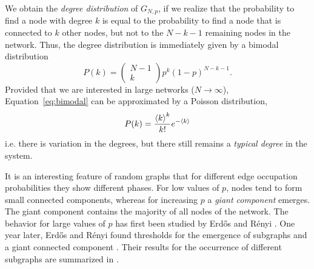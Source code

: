 We obtain the \emph{degree distribution} of $G_{N,p}$, if we realize that the probability to find a node with degree $k$ is equal to the probability to find a node that is connected to $k$ other nodes, but not to the $N-k-1$ remaining nodes in the network.
Thus, the degree distribution is immediately given by a bimodal distribution
\begin{equation}\label{eq:bimodal}
P(k)= \left(\begin{array}{c}N-1 \\k\end{array}\right) p^k (1-p)^{N-k-1} .
\end{equation}
Provided that we are interested in large networks ($N\rightarrow \infty $), Equation~\eqref{eq:bimodal} can be approximated by a Poisson distribution,
\begin{equation}\label{eq:poisson_distribution}
P(k) =\frac{\left< k \right>^k }{k!} e^{-\left< k \right>}
\end{equation}
i.e. there is variation in the degrees, but there still remains a \emph{typical degree} in the system.

It is an interesting feature of random graphs that for different edge occupation probabilities they show different phases.
For low values of $p$, nodes tend to form small connected components, whereas for increasing $p$ a \emph{giant component} emerges.
The giant component contains the majority of all nodes of the network.
The behavior for large values of $p$ has first been studied by Erd\H{o}s and R\'enyi \citep{ER:1959}.
One year later, Erd\H{o}s and R\'enyi found thresholds for the emergence of subgraphs and a giant connected component \citep{ER:1960,ER:1961}.
Their results for the occurrence of different subgraphs are summarized in \citep{RevModPhys.74}.

